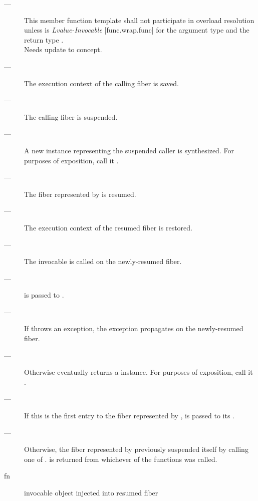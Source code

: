 \effects
\begin{description}
    \item[---] This member function template shall not participate in overload
               resolution unless  is \emph{Lvalue-Invocable} [func.wrap.func]
               for the argument type  and the return
               type \fiber.\\
                Needs update to  concept.
    \item[---] The execution context of the calling fiber is saved.
    \item[---] The calling fiber is suspended.
    \item[---] A new \fiber instance representing the suspended caller is
               synthesized. For purposes of exposition, call it .
    \item[---] The fiber represented by  is resumed.
    \item[---] The execution context of the resumed fiber is restored.
    \item[---] The invocable  is called on the newly-resumed fiber.
    \item[---]  is passed to .
    \item[---] If  throws an exception, the exception propagates on
               the newly-resumed fiber.
    \item[---] Otherwise  eventually returns a \fiber instance. For
               purposes of exposition, call it .
    \item[---] If this is the first entry to the fiber represented
               by ,  is passed to its \entryfn.
    \item[---] Otherwise, the fiber represented by  previously
               suspended itself by calling one of \allresume. 
               is returned from whichever of the  functions was
               called.
\end{description}

\params
\begin{description}
    \item[fn] invocable object injected into resumed fiber
\end{description}


